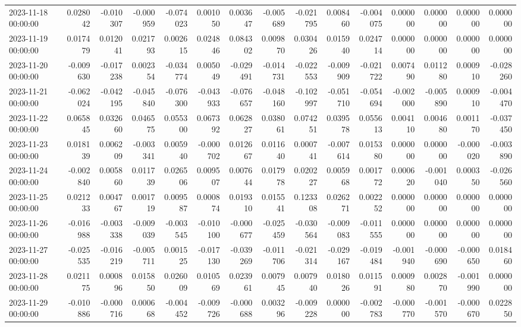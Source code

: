 \begin{tabular}{lrrrrrrrrrrrrrr}
2023-11-18 00:00:00 & 0.028042 & -0.010307 & -0.000959 & -0.074023 & 0.001050 & 0.003647 & -0.005689 & -0.021795 & 0.008460 & -0.004075 & 0.000000 & 0.000000 & 0.000000 & 0.000000 \\
2023-11-19 00:00:00 & 0.017479 & 0.012041 & 0.021793 & 0.002615 & 0.024846 & 0.084302 & 0.009870 & 0.030426 & 0.015940 & 0.024714 & 0.000000 & 0.000000 & 0.000000 & 0.000000 \\
2023-11-20 00:00:00 & -0.009630 & -0.017238 & 0.002354 & -0.034774 & 0.005049 & -0.029491 & -0.014731 & -0.022553 & -0.009909 & -0.021722 & 0.007490 & 0.011280 & 0.000910 & -0.028260 \\
2023-11-21 00:00:00 & -0.062024 & -0.042195 & -0.045840 & -0.076300 & -0.043933 & -0.076657 & -0.048160 & -0.102997 & -0.051710 & -0.054694 & -0.002000 & -0.005890 & 0.000910 & -0.004470 \\
2023-11-22 00:00:00 & 0.065845 & 0.032660 & 0.046575 & 0.055300 & 0.067392 & 0.062827 & 0.038061 & 0.074251 & 0.039578 & 0.055613 & 0.004110 & 0.004680 & 0.001170 & -0.037450 \\
2023-11-23 00:00:00 & 0.018139 & 0.006209 & -0.003341 & 0.005940 & -0.000702 & 0.012667 & 0.011640 & 0.000741 & -0.007614 & 0.015380 & 0.000000 & 0.000000 & -0.000020 & -0.003890 \\
2023-11-24 00:00:00 & -0.002840 & 0.005860 & 0.011739 & 0.026506 & 0.009507 & 0.007644 & 0.017978 & 0.020227 & 0.005968 & 0.001772 & 0.000620 & -0.001040 & 0.000350 & -0.026560 \\
2023-11-25 00:00:00 & 0.021233 & 0.004767 & 0.001719 & 0.009587 & 0.000874 & 0.019310 & 0.015541 & 0.123308 & 0.026271 & 0.002252 & 0.000000 & 0.000000 & 0.000000 & 0.000000 \\
2023-11-26 00:00:00 & -0.016988 & -0.003338 & -0.009039 & -0.003545 & -0.010100 & -0.000677 & -0.025459 & -0.030564 & -0.009083 & -0.011555 & 0.000000 & 0.000000 & 0.000000 & 0.000000 \\
2023-11-27 00:00:00 & -0.025535 & -0.016219 & -0.005711 & 0.001525 & -0.017130 & -0.039269 & -0.011706 & -0.021314 & -0.029167 & -0.019484 & -0.001940 & -0.000690 & -0.000650 & 0.018460 \\
2023-11-28 00:00:00 & 0.021175 & 0.000896 & 0.015850 & 0.026009 & 0.010569 & 0.023961 & 0.007945 & 0.007940 & 0.018026 & 0.011591 & 0.000980 & 0.002870 & -0.001990 & 0.000000 \\
2023-11-29 00:00:00 & -0.010886 & -0.000716 & 0.000668 & -0.004452 & -0.009726 & -0.000688 & 0.003296 & -0.009228 & 0.000000 & -0.002783 & -0.000770 & -0.001570 & -0.000670 & 0.022850 \\

\end{tabular}
